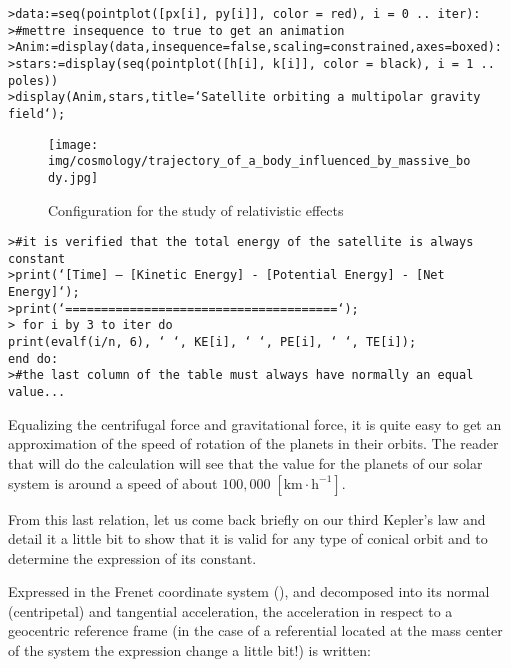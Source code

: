 	\texttt{>data:=seq(pointplot([px[i], py[i]], color = red), i = 0 .. iter):\\
	>\#mettre insequence to true to get an animation\\
	>Anim:=display(data,insequence=false,scaling=constrained,axes=boxed):\\
	>stars:=display(seq(pointplot([h[i], k[i]], color = black), i = 1 .. poles))\\
	>display({Anim,stars},title=`Satellite orbiting a multipolar gravity field`);}

	\begin{figure}[H]
		\centering
		\texttt{[image: img/cosmology/trajectory\_of\_a\_body\_influenced\_by\_massive\_body.jpg]}	
		\caption{Configuration for the study of relativistic effects}
	\end{figure}

	\texttt{>\#it is verified that the total energy of the satellite is always constant\\
	>print(`[Time] -- [Kinetic Energy] - [Potential Energy] - [Net Energy]`);\\
	>print(`======================================`);\\
	> for i by 3 to iter do\\
	print(evalf(i/n, 6), ` `, KE[i], ` `, PE[i], ` `, TE[i]);\\
	end do:\\
	>\#the last column of the table must always have normally an equal value...}
	
	\begin{tcolorbox}[title=Remark,colframe=black,arc=10pt]
	Equalizing the centrifugal force and gravitational force, it is quite easy to get an approximation of the speed of rotation of the planets in their orbits. The reader that will do the calculation will see that the value for the planets of our solar system is around a speed of about $100,000\;[\text{km}\cdot \text{h}^{-1}]$.
	\end{tcolorbox}	
	
	From this last relation, let us come back briefly on our third Kepler's law and detail it a little bit to show that it is valid for any type of conical orbit and to determine the expression of its constant.
	
	Expressed in the Frenet coordinate system (), and decomposed into its normal (centripetal) and tangential acceleration, the acceleration in respect to a geocentric reference frame (in the case of a referential located at the mass center of the system the expression change a little bit!) is written:
	
